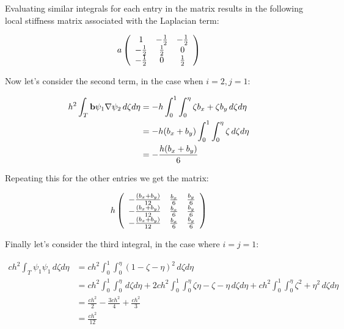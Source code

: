 Evaluating similar integrals for each entry in the matrix results in the following
local stiffness matrix associated with the Laplacian term:

\begin{equation}\label{eq:stiffness_term_1}
    a\left(\begin{array}{c c c}
        1      & -\frac{1}{2} & -\frac{1}{2} \\
        -\frac{1}{2} & \frac{1}{2}  & 0 \\
        -\frac{1}{2} & 0      & \frac{1}{2}
    \end{array}\right)
\end{equation}

Now let's consider the second term, in the case when $i = 2, j = 1$:

\begin{align*}
    h^2\int_T{\mathbf{b}\psi_1\nabla\psi_2}\, d\zeta d\eta &=
    -h\int_0^1\int_0^\eta{\zeta b_x + \zeta b_y}\, d\zeta d\eta \\
    &= -h(b_x + b_y)\int_0^1\int_0^\eta{\zeta}\, d\zeta d\eta \\
    &= -\frac{h(b_x + b_y)}{6}
\end{align*}

Repeating this for the other entries we get the matrix:

\begin{equation}\label{eq:stiffness_term_2}
    h\left(\begin{array}{c c c}
        -\frac{(b_x + b_y)}{12} & \frac{b_x}{6} & \frac{b_y}{6} \\
        -\frac{(b_x + b_y)}{12} & \frac{b_x}{6} & \frac{b_y}{6} \\
        -\frac{(b_x + b_y)}{12} & \frac{b_x}{6} & \frac{b_y}{6}
    \end{array}\right)
\end{equation}

Finally let's consider the third integral, in the case where $i = j = 1$:

\begin{align*}
       ch^2\int_T{\psi_1\psi_1}\,d\zeta d\eta
       &= ch^2\int_0^1\int_0^\eta{(1 - \zeta - \eta)^2}\, d\zeta d\eta \\
%
       &= ch^2\int_0^1\int_0^\eta\, d\zeta d\eta +
          2ch^2\int_0^1\int_0^\eta{\zeta\eta - \zeta - \eta}\, d\zeta d\eta +
          ch^2\int_0^1\int_0^\eta{\zeta^2 + \eta^2}\, d\zeta d\eta \\
%
       &= \frac{ch^2}{2} - \frac{3ch^2}{4} + \frac{ch^2}{3} \\
       &= \frac{ch^2}{12}
\end{align*}

